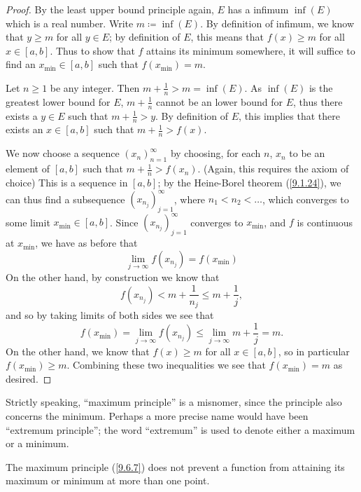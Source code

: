 \begin{proof}
  By the least upper bound principle again, \(E\) has a infimum \(\inf(E)\) which is a real number.
  Write \(m \coloneqq \inf(E)\).
  By definition of infimum, we know that \(y \geq m\) for all \(y \in E\);
  by definition of \(E\), this means that \(f(x) \geq m\) for all \(x \in [a, b]\).
  Thus to show that \(f\) attains its minimum somewhere, it will suffice to find an \(x_{\min} \in [a, b]\) such that \(f(x_{\min}) = m\).

  Let \(n \geq 1\) be any integer.
  Then \(m + \frac{1}{n} > m = \inf(E)\).
  As \(\inf(E)\) is the greatest lower bound for \(E\), \(m + \frac{1}{n}\) cannot be an lower bound for \(E\), thus there exists a \(y \in E\) such that \(m + \frac{1}{n} > y\).
  By definition of \(E\), this implies that there exists an \(x \in [a, b]\) such that \(m + \frac{1}{n} > f(x)\).

  We now choose a sequence \((x_n)_{n = 1}^\infty\) by choosing, for each \(n\), \(x_n\) to be an element of \([a, b]\) such that \(m + \frac{1}{n} > f(x_n)\).
  (Again, this requires the axiom of choice)
  This is a sequence in \([a, b]\);
  by the Heine-Borel theorem (\cref{9.1.24}), we can thus find a subsequence \((x_{n_j})_{j = 1}^\infty\), where \(n_1 < n_2 < \dots\), which converges to some limit \(x_{\min} \in [a, b]\).
  Since \((x_{n_j})_{j = 1}^\infty\) converges to \(x_{\min}\), and \(f\) is continuous at \(x_{\min}\), we have as before that
  \[
    \lim_{j \to \infty} f(x_{n_j}) = f(x_{\min})
  \]
  On the other hand, by construction we know that
  \[
    f(x_{n_j}) < m + \frac{1}{n_j} \leq m + \frac{1}{j},
  \]
  and so by taking limits of both sides we see that
  \[
    f(x_{\min}) = \lim_{j \to \infty} f(x_{n_j}) \leq \lim_{j \to \infty} m + \frac{1}{j} = m.
  \]
  On the other hand, we know that \(f(x) \geq m\) for all \(x \in [a, b]\), so in particular \(f(x_{\min}) \geq m\).
  Combining these two inequalities we see that \(f(x_{\min}) = m\) as desired.
\end{proof}

\begin{rmk}\label{9.6.8}
  Strictly speaking, ``maximum principle'' is a misnomer, since the principle also concerns the minimum.
  Perhaps a more precise name would have been ``extremum principle'';
  the word ``extremum'' is used to denote either a maximum or a minimum.
\end{rmk}

\begin{note}
  The maximum principle (\cref{9.6.7}) does not prevent a function from attaining its maximum or minimum at more than one point.
\end{note}

